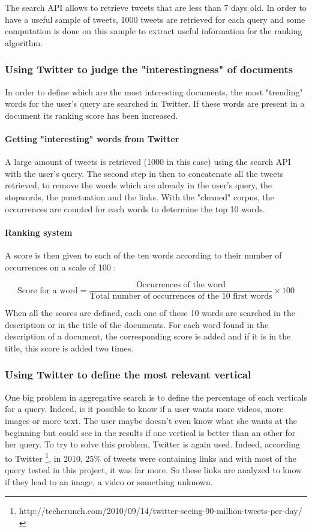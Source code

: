 \documentclass{acmsmall}
\begin{document}
The search API allows to retrieve tweets that are less than 7 days old. In order to have a useful sample of tweets, 1000 tweets are retrieved for each query and some computation is done on this sample to extract useful information for the ranking algorithm.

\subsubsection{Using Twitter to judge the "interestingness" of documents}
In order to define which are the most interesting documents, the most "trending" words for the user's query are searched in Twitter. If these words are present in a document its ranking score has been increased.

\paragraph{Getting "interesting" words from Twitter}
A large amount of tweets is retrieved (1000 in this case) using the search API with the user's query. The second step in then to concatenate all the tweets retrieved, to remove the words which are already in the user's query, the stopwords, the punctuation and the links. With the "cleaned" corpus, the occurrences are counted for each words to determine the top 10 words.

\paragraph{Ranking system}
A score is then given to each of the ten words according to their number of occurrences on a scale of 100 :

\[ \textrm{Score for a word} = \frac{\textrm{Occurrences of the word}}{\textrm{Total number of occurrences of the 10 first words}} \times 100 \]

When all the scores are defined, each one of these 10 words are searched in the description or in the title of the documents. For each word found in the description of a document, the corresponding score is added and if it is in the title, this score is added two times.

\subsubsection{Using Twitter to define the most relevant vertical}
One big problem in aggregative search is to define the percentage of each verticals for a query. Indeed, is it possible to know if a user wants more videos, more images or more text. The user maybe doesn't even know what she wants at the beginning but could see in the results if one vertical is better than an other for her query. To try to solve this problem, Twitter is again used. Indeed, according to Twitter \footnote{http://techcrunch.com/2010/09/14/twitter-seeing-90-million-tweets-per-day/}, in 2010, 25\% of tweets were containing links and with most of the query tested in this project, it was far more. So these links are analyzed to know if they lead to an image, a video or something unknown.
\end{document}

